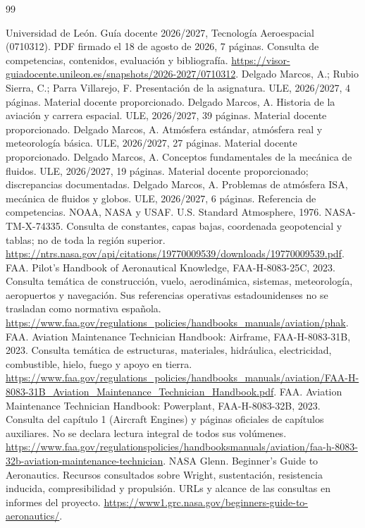 \begin{thebibliography}{99}
 Universidad de León. Guía docente 2026/2027, Tecnología Aeroespacial (0710312). PDF firmado el 18 de agosto de 2026, 7 páginas. Consulta de competencias, contenidos, evaluación y bibliografía. \url{https://visor-guiadocente.unileon.es/snapshots/2026-2027/0710312}.
 Delgado Marcos, A.; Rubio Sierra, C.; Parra Villarejo, F. Presentación de la asignatura. ULE, 2026/2027, 4 páginas. Material docente proporcionado.
 Delgado Marcos, A. Historia de la aviación y carrera espacial. ULE, 2026/2027, 39 páginas. Material docente proporcionado.
 Delgado Marcos, A. Atmósfera estándar, atmósfera real y meteorología básica. ULE, 2026/2027, 27 páginas. Material docente proporcionado.
 Delgado Marcos, A. Conceptos fundamentales de la mecánica de fluidos. ULE, 2026/2027, 19 páginas. Material docente proporcionado; discrepancias documentadas.
 Delgado Marcos, A. Problemas de atmósfera ISA, mecánica de fluidos y globos. ULE, 2026/2027, 6 páginas. Referencia de competencias.
 NOAA, NASA y USAF. U.S. Standard Atmosphere, 1976. NASA-TM-X-74335. Consulta de constantes, capas bajas, coordenada geopotencial y tablas; no de toda la región superior. \url{https://ntrs.nasa.gov/api/citations/19770009539/downloads/19770009539.pdf}.
 FAA. Pilot’s Handbook of Aeronautical Knowledge, FAA-H-8083-25C, 2023. Consulta temática de construcción, vuelo, aerodinámica, sistemas, meteorología, aeropuertos y navegación. Sus referencias operativas estadounidenses no se trasladan como normativa española. \url{https://www.faa.gov/regulations_policies/handbooks_manuals/aviation/phak}.
 FAA. Aviation Maintenance Technician Handbook: Airframe, FAA-H-8083-31B, 2023. Consulta temática de estructuras, materiales, hidráulica, electricidad, combustible, hielo, fuego y apoyo en tierra. \url{https://www.faa.gov/regulations_policies/handbooks_manuals/aviation/FAA-H-8083-31B_Aviation_Maintenance_Technician_Handbook.pdf}.
 FAA. Aviation Maintenance Technician Handbook: Powerplant, FAA-H-8083-32B, 2023. Consulta del capítulo 1 (Aircraft Engines) y páginas oficiales de capítulos auxiliares. No se declara lectura integral de todos sus volúmenes. \url{https://www.faa.gov/regulationspolicies/handbooksmanuals/aviation/faa-h-8083-32b-aviation-maintenance-technician}.
 NASA Glenn. Beginner’s Guide to Aeronautics. Recursos consultados sobre Wright, sustentación, resistencia inducida, compresibilidad y propulsión. URLs y alcance de las consultas en informes del proyecto. \url{https://www1.grc.nasa.gov/beginners-guide-to-aeronautics/}.

\end{thebibliography}

